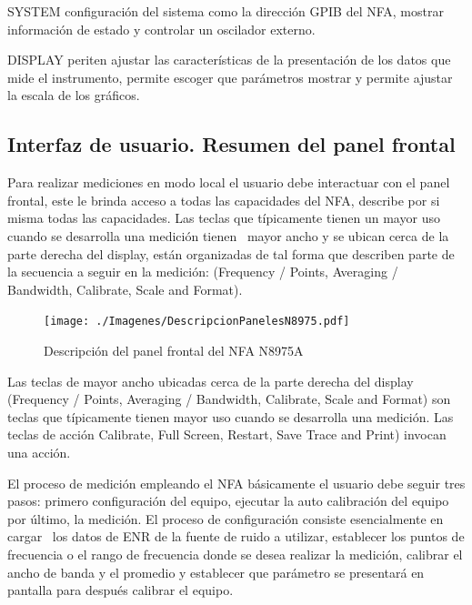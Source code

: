 	SYSTEM configuración del sistema como la dirección GPIB del NFA, mostrar información de estado y controlar un oscilador externo.
	
	DISPLAY periten ajustar las características de la presentación de los datos que mide el instrumento, permite escoger que	parámetros mostrar y permite ajustar la escala de los gráficos.
			

	\clearpage
	\subsection{Interfaz de usuario. Resumen del panel frontal}
	Para realizar mediciones en modo local el usuario debe interactuar con el panel frontal, este le brinda acceso a todas las capacidades del NFA, describe por si misma todas las capacidades. Las teclas que típicamente tienen un mayor uso cuando se desarrolla una medición tienen \ mayor ancho y se ubican cerca de la parte derecha del display, están organizadas de tal forma que describen parte de la secuencia a seguir en la medición: (Frequency / Points, Averaging	/ Bandwidth, Calibrate, Scale and Format).
	
	\begin{figure}[ht]
		\centering
		\texttt{[image: ./Imagenes/DescripcionPanelesN8975.pdf]}
		\caption{Descripción del panel frontal del NFA N8975A}
		\label{Fig:DescripcionPanelesN8975}	
	\end{figure}
	
	Las teclas de mayor ancho ubicadas cerca de la parte derecha del display (Frequency / Points, Averaging / Bandwidth, Calibrate, Scale and Format) son teclas que típicamente tienen mayor uso cuando se desarrolla una medición. Las teclas de acción Calibrate, Full Screen, Restart, Save Trace and Print) invocan una acción.
			
	El proceso de medición empleando el NFA básicamente el usuario debe seguir tres pasos: primero configuración del equipo, ejecutar la auto calibración del equipo por último, la medición. El proceso de configuración consiste esencialmente en cargar \ los datos de ENR de la fuente de ruido a utilizar, establecer los puntos de frecuencia o el rango de frecuencia donde se desea realizar la medición, calibrar el ancho de banda y el promedio y establecer que parámetro se presentará en pantalla para después calibrar el equipo.
	
